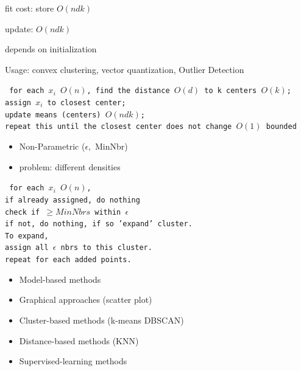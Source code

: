 \documentclass[1pt,letter]{article}
\def\items#1{\begin{itemize}[noitemsep,topsep=0pt,parsep=0pt,partopsep=0pt]#1\end{itemize}}
\begin{document}
\begin{minipage}{0.45\textwidth}
{{                \item fit cost: store $O(ndk)$
                \item update: $O(ndk)$ 
                \item depends on initialization
                \item Usage: convex clustering, vector quantization, Outlier Detection
            }
            \texttt{
                for each $x_i$ $O(n)$, find the distance $O(d)$ to k centers $O(k)$; \\
                assign  $x_i$ to closest center; \\
                update means (centers) $O(ndk)$; \\
                repeat this until the closest center does not change $O(1)$ bounded             
            }
        \item
            \items{
                \item Non-Parametric ($\epsilon,$ MinNbr)
                \item problem: different densities 
            }
            \texttt{
                for each $x_i$ $O(n)$, \\
                if already assigned, do nothing \\
                check if $\geq MinNbrs$ within $\epsilon$ \\
                if not, do nothing, if so 'expand' cluster. \\
                To expand, \\
                assign all $\epsilon$ nbrs to this cluster. \\
                repeat for each added points.
            }
        \item
            \items{
                \item Model-based methods
                \item Graphical approaches (scatter plot)
                \item Cluster-based methods (k-means DBSCAN)
                \item Distance-based methods (KNN)
                \item Supervised-learning methods    
            }
    }

\end{minipage}
\end{document}
